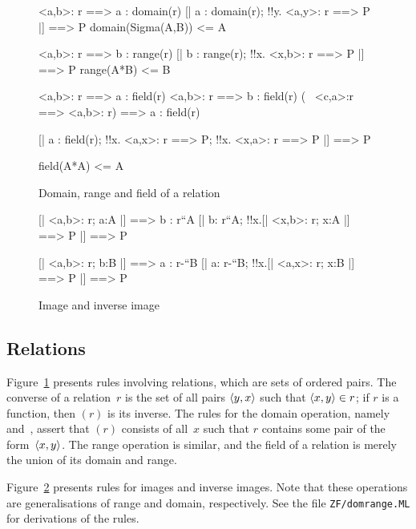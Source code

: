 \begin{figure}
\begin{ttbox}
        <a,b>: r ==> a : domain(r)
        [| a : domain(r);  !!y. <a,y>: r ==> P |] ==> P
  domain(Sigma(A,B)) <= A

         <a,b>: r ==> b : range(r)
         [| b : range(r);  !!x. <x,b>: r ==> P |] ==> P
   range(A*B) <= B

        <a,b>: r ==> a : field(r)
        <a,b>: r ==> b : field(r)
        (~ <c,a>:r ==> <a,b>: r) ==> a : field(r)

         [| a : field(r);  
                  !!x. <a,x>: r ==> P;  
                  !!x. <x,a>: r ==> P      
               |] ==> P

   field(A*A) <= A
\end{ttbox}
\caption{Domain, range and field of a relation} \label{zf-domrange}
\end{figure}

\begin{figure}
\begin{ttbox}
         [| <a,b>: r;  a:A |] ==> b : r``A
         [| b: r``A;  !!x.[| <x,b>: r;  x:A |] ==> P |] ==> P

        [| <a,b>: r;  b:B |] ==> a : r-``B
        [| a: r-``B;  !!x.[| <a,x>: r;  x:B |] ==> P |] ==> P
\end{ttbox}
\caption{Image and inverse image} \label{zf-domrange2}
\end{figure}


\subsection{Relations}
Figure~\ref{zf-domrange} presents rules involving relations, which are sets
of ordered pairs.  The converse of a relation~$r$ is the set of all pairs
$\langle y,x\rangle$ such that $\langle x,y\rangle\in r$; if $r$ is a function, then
{$(r)$} is its inverse.  The rules for the domain
operation, namely  and~, assert that
$(r)$ consists of all~$x$ such that $r$ contains
some pair of the form~$\langle x,y\rangle$.  The range operation is similar, and
the field of a relation is merely the union of its domain and range.  

Figure~\ref{zf-domrange2} presents rules for images and inverse images.
Note that these operations are generalisations of range and domain,
respectively.  See the file \texttt{ZF/domrange.ML} for derivations of the
rules.


